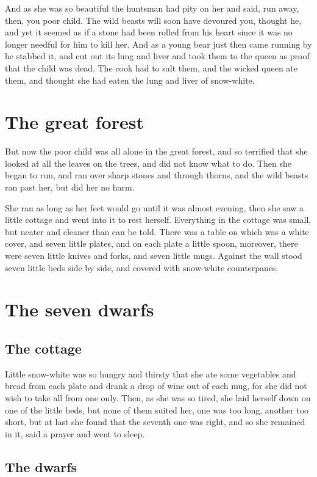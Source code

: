 \documentclass[a4paper,11pt]{article}
\begin{document}
And as she was so beautiful the huntsman had pity on her and
said, run away, then, you poor child.  The wild beasts will soon
have devoured you, thought he, and yet it seemed as if a stone had
been rolled from his heart since it was no longer needful for
him to kill her.  And as a young bear just then came running by
he stabbed it, and cut out its lung and liver and took them to the
queen as proof that the child was dead.  The cook had to salt them,
and the wicked queen ate them, and thought she had eaten the lung
and liver of snow-white.


\section{The great forest}

But now the poor child was all alone in the great forest, and so
terrified that she looked at all the leaves on the trees, and did
not know what to do.  Then she began to run, and ran over sharp
stones and through thorns, and the wild beasts ran past her, but
did her no harm.

She ran as long as her feet would go until it was almost evening,
then she saw a little cottage and went into it to rest herself.
Everything in the cottage was small, but neater and cleaner than
can be told.  There was a table on which was a white cover, and
seven little plates, and on each plate a little spoon, moreover,
there were seven little knives and forks, and seven little mugs.
Against the wall stood seven little beds side by side, and
covered with snow-white counterpanes.

\section{The seven dwarfs}
\subsection{The cottage}

Little snow-white was so hungry and thirsty that she ate some
vegetables and bread from each plate and drank a drop of wine
out of each mug, for she did not wish to take all from one only.
Then, as she was so tired, she laid herself down on one of the
little beds, but none of them suited her, one was too long,
another too short, but at last she found that the seventh one was
right, and so she remained in it, said a prayer and went to
sleep.

\subsection{The dwarfs}
\end{document}
